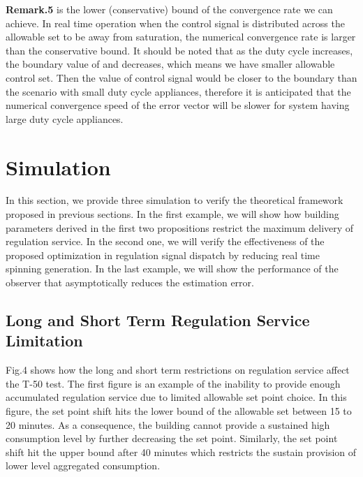\documentclass[journal]{IEEEtran}
\begin{document}
\textbf{Remark.5}  is the lower (conservative) bound of the convergence rate we can achieve. In real time operation when the control signal is distributed across the allowable set to be away from saturation, the numerical convergence rate is larger than the conservative bound. It should be noted that as the duty cycle increases, the boundary value of  and  decreases, which means we have smaller allowable control set. Then the value of control signal would be closer to the boundary than the scenario with small duty cycle appliances, therefore it is anticipated that the numerical convergence speed of the error vector will be slower for system having large duty cycle appliances.




\section{Simulation}
In this section, we provide three simulation to verify the theoretical framework proposed in previous sections. In the first example, we will show how building parameters derived in the first two propositions restrict the maximum delivery of regulation service. In the second one, we will verify the effectiveness of the proposed  optimization in regulation signal dispatch by reducing real time spinning generation. In the last example, we will show the performance of the observer that asymptotically reduces the estimation error.
\label{simulation section}
\subsection{Long and Short Term Regulation Service Limitation}
Fig.4 shows how the long and short term restrictions on regulation service affect the T-50 test. The first figure is an example of the inability to provide enough accumulated regulation service due to limited allowable set point choice. In this figure, the set point shift hits the lower bound of the allowable set between 15 to 20 minutes. As a consequence, the building cannot provide a sustained high consumption level by further decreasing the set point. Similarly, the set point shift hit the upper bound after 40 minutes which restricts the sustain provision of lower level aggregated consumption.  
\end{document}
